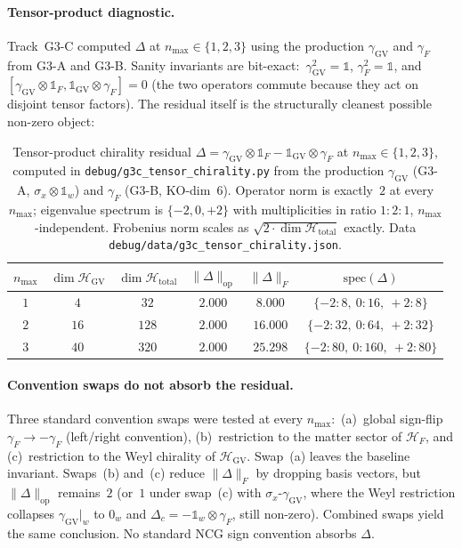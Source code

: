 \documentclass[11pt]{article}
\begin{document}
\paragraph{Tensor-product diagnostic.}  Track~G3-C computed $\Delta$
at $n_{\max} \in \{1, 2, 3\}$ using the production
$\gamma_{\mathrm{GV}}$ and $\gamma_F$ from G3-A and G3-B.  Sanity
invariants are bit-exact:\ $\gamma_{\mathrm{GV}}^2 = \mathbb{1}$,
$\gamma_F^2 = \mathbb{1}$, and
$[\gamma_{\mathrm{GV}} \otimes \mathbb{1}_F,
\mathbb{1}_{\mathrm{GV}} \otimes \gamma_F] = 0$ (the two operators
commute because they act on disjoint tensor factors).  The residual
itself is the structurally cleanest possible non-zero object:

\begin{table}[h]
\centering
\small
\begin{tabular}{|c|c|c|c|c|c|}
\hline
$n_{\max}$ & $\dim \mathcal{H}_{\mathrm{GV}}$ &
$\dim \mathcal{H}_{\mathrm{total}}$ &
$\|\Delta\|_{\mathrm{op}}$ & $\|\Delta\|_F$ &
$\mathrm{spec}(\Delta)$ \\
\hline
$1$ & $4$  & $32$  & $2.000$ & $8.000$  &
$\{-2{:}8,\ 0{:}16,\ +2{:}8\}$    \\
$2$ & $16$ & $128$ & $2.000$ & $16.000$ &
$\{-2{:}32,\ 0{:}64,\ +2{:}32\}$  \\
$3$ & $40$ & $320$ & $2.000$ & $25.298$ &
$\{-2{:}80,\ 0{:}160,\ +2{:}80\}$ \\
\hline
\end{tabular}
\caption{Tensor-product chirality residual $\Delta =
\gamma_{\mathrm{GV}} \otimes \mathbb{1}_F -
\mathbb{1}_{\mathrm{GV}} \otimes \gamma_F$ at
$n_{\max} \in \{1, 2, 3\}$, computed in
\texttt{debug/g3c\_tensor\_chirality.py} from the production
$\gamma_{\mathrm{GV}}$ (G3-A, $\sigma_x \otimes \mathbb{1}_w$) and
$\gamma_F$ (G3-B, KO-dim~6).  Operator norm is exactly~$2$ at every
$n_{\max}$; eigenvalue spectrum is $\{-2, 0, +2\}$ with
multiplicities in ratio $1{:}2{:}1$, $n_{\max}$-independent.
Frobenius norm scales as
$\sqrt{2 \cdot \dim \mathcal{H}_{\mathrm{total}}}$ exactly.  Data
\texttt{debug/data/g3c\_tensor\_chirality.json}.}
\label{tab:g3c_residual}
\end{table}

\paragraph{Convention swaps do not absorb the residual.}  Three
standard convention swaps were tested at every $n_{\max}$:\
(a)~global sign-flip $\gamma_F \to -\gamma_F$ (left/right
convention), (b)~restriction to the matter sector of
$\mathcal{H}_F$, and (c)~restriction to the Weyl chirality of
$\mathcal{H}_{\mathrm{GV}}$.  Swap~(a) leaves the baseline invariant.
Swaps~(b) and~(c) reduce $\|\Delta\|_F$ by dropping basis vectors,
but $\|\Delta\|_{\mathrm{op}}$ remains~$2$ (or~$1$ under swap~(c)
with $\sigma_x$-$\gamma_{\mathrm{GV}}$, where the Weyl restriction
collapses $\gamma_{\mathrm{GV}}|_w$ to $0_w$ and $\Delta_c =
-\mathbb{1}_w \otimes \gamma_F$, still non-zero).  Combined swaps
yield the same conclusion.  No standard NCG sign convention absorbs
$\Delta$.
\end{document}
